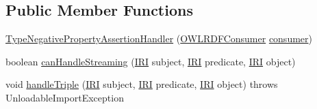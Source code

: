 \subsection*{Public Member Functions}
\begin{DoxyCompactItemize}
\item 
\hyperlink{classorg_1_1coode_1_1owlapi_1_1rdfxml_1_1parser_1_1_type_negative_property_assertion_handler_afcba7aff7a05757c585e48baa2f1cd69}{Type\-Negative\-Property\-Assertion\-Handler} (\hyperlink{classorg_1_1coode_1_1owlapi_1_1rdfxml_1_1parser_1_1_o_w_l_r_d_f_consumer}{O\-W\-L\-R\-D\-F\-Consumer} \hyperlink{classorg_1_1coode_1_1owlapi_1_1rdfxml_1_1parser_1_1_abstract_triple_handler_a4ccf4d898ff01eb1cadfa04b23d54e9c}{consumer})
\item 
boolean \hyperlink{classorg_1_1coode_1_1owlapi_1_1rdfxml_1_1parser_1_1_type_negative_property_assertion_handler_a13358ee01e5b2950a909702f3fc7d01d}{can\-Handle\-Streaming} (\hyperlink{classorg_1_1semanticweb_1_1owlapi_1_1model_1_1_i_r_i}{I\-R\-I} subject, \hyperlink{classorg_1_1semanticweb_1_1owlapi_1_1model_1_1_i_r_i}{I\-R\-I} predicate, \hyperlink{classorg_1_1semanticweb_1_1owlapi_1_1model_1_1_i_r_i}{I\-R\-I} object)
\item 
void \hyperlink{classorg_1_1coode_1_1owlapi_1_1rdfxml_1_1parser_1_1_type_negative_property_assertion_handler_a25b86850f06bdc22bfdba93ccb905462}{handle\-Triple} (\hyperlink{classorg_1_1semanticweb_1_1owlapi_1_1model_1_1_i_r_i}{I\-R\-I} subject, \hyperlink{classorg_1_1semanticweb_1_1owlapi_1_1model_1_1_i_r_i}{I\-R\-I} predicate, \hyperlink{classorg_1_1semanticweb_1_1owlapi_1_1model_1_1_i_r_i}{I\-R\-I} object)  throws Unloadable\-Import\-Exception 
\end{DoxyCompactItemize}
